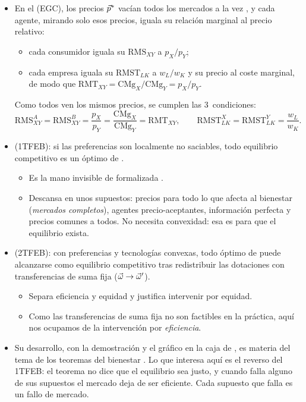 \documentclass[11pt]{article}
\begin{document}
\begin{itemize}
\item En el  (EGC), los precios $\vec{p}^*$ vacían todos los mercados a la vez , y cada agente, mirando solo esos precios, iguala su relación marginal al precio relativo:
  \begin{itemize}
  \item cada consumidor iguala su $\mathrm{RMS}_{XY}$ a $p_X/p_Y$;
  \item cada empresa iguala su $\mathrm{RMST}_{LK}$ a $w_L/w_K$ y su precio al coste marginal, de modo que $\mathrm{RMT}_{XY}=\mathrm{CMg}_X/\mathrm{CMg}_Y=p_X/p_Y$.
  \end{itemize}
  Como todos ven los mismos precios, se cumplen las 3~condiciones:
  \begin{equation}\label{eq:egc-pareto}
  \mathrm{RMS}^A_{XY}=\mathrm{RMS}^B_{XY}=\frac{p_X}{p_Y}=\frac{\mathrm{CMg}_X}{\mathrm{CMg}_Y}=\mathrm{RMT}_{XY},\qquad \mathrm{RMST}^X_{LK}=\mathrm{RMST}^Y_{LK}=\frac{w_L}{w_K}.
  \end{equation}
\item {} (1TFEB): si las preferencias son localmente no saciables, todo equilibrio competitivo es un óptimo de \nocite{Arrow1951Extension,Debreu1951Coefficient,MasColellWhinstonGreen1995}.
  \begin{itemize}
  \item Es la mano invisible de  formalizada .
  \item Descansa en unos supuestos: precios para todo lo que afecta al bienestar (\emph{mercados completos}), agentes precio-aceptantes, información perfecta y precios comunes a todos. No necesita convexidad: esa es para que el equilibrio exista.
  \end{itemize}
\item {} (2TFEB): con preferencias y tecnologías convexas, todo óptimo de  puede alcanzarse como equilibrio competitivo tras redistribuir las dotaciones con transferencias de suma fija ($\vec{\omega}\to\vec{\omega}'$).
  \begin{itemize}
  \item Separa eficiencia y equidad y justifica intervenir por equidad.
  \item Como las transferencias de suma fija no son factibles en la práctica, aquí nos ocupamos de la intervención por \emph{eficiencia}.
  \end{itemize}
\item Su desarrollo, con la demostración y el gráfico en la caja de , es materia del tema de los teoremas del bienestar . Lo que interesa aquí es el reverso del 1TFEB: el teorema no dice que el equilibrio sea justo, y cuando falla alguno de sus supuestos el mercado deja de ser eficiente. Cada supuesto que falla es un fallo de mercado.
\end{itemize}
\end{document}
